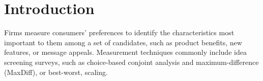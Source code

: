 \documentclass[nonblindrev]{informs3}
\begin{document}
%


\newpage

\section{Introduction}


Firms measure consumers' preferences to identify the characteristics most important to them among a set of candidates, such as product benefits, new features, or message appeals. Measurement techniques commonly include idea screening surveys, such as choice-based conjoint analysis and maximum-difference (MaxDiff), or best-worst, scaling. 
\end{document}
